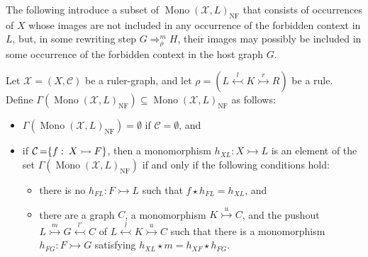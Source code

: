 The following introduce a subset of $\operatorname{Mono}(\mathcal{X},L)_{\operatorname{NF}}$ that consists of occurrences of $X$ whose images are not included in any occurrence of the forbidden context in $L$,
    but, in some rewriting step $G \mathop{\Rightarrow}_\rho^m H$, their images may possibly be included in some occurrence of the forbidden context in the host graph $G$.
\begin{definition}
    \label{antipattern:def:gamma_l_rho_x}
    Let $\mathcal{X}=(X,\mathcal{C})$ be a ruler-graph, and let \( \rho \mathop{=} (L \overset{l}{\leftarrowtail} K \overset{r}{\rightarrowtail} R) \) be a rule.
    Define $\Gamma(\operatorname{Mono}(\mathcal{X},L)_{\operatorname{NF}})\subseteq \operatorname{Mono}(\mathcal{X},L)_{\operatorname{NF}}$ as follows:
    \begin{itemize}
        \item $\Gamma(\operatorname{Mono}(\mathcal{X},L)_{\operatorname{NF}}) \mathop{=} \emptyset$ if $\mathcal{C} \mathop{=} \emptyset$, and
        \item if $\mathcal{C} \mathop{=} \{f\mathop{\colon}X \rightarrowtail F\}$, then a monomorphism $h_{XL} \mathop{\colon} X \rightarrowtail L$ is an element of the set $\Gamma(\operatorname{Mono}(\mathcal{X},L)_{\operatorname{NF}})$ if and only if the following conditions hold:
            \begin{itemize}
                \item there is no $h_{FL}:F \rightarrowtail L$ such that $f \mathop{\star} h_{FL} \mathop{=} h_{XL}$, and
                \item  
                there are a graph $C$, a monomorphism $K \overset{u}{\rightarrowtail} C$, and the pushout $L \overset{m}{\rightarrowtail} G \overset{l'}{\leftarrowtail} C$ of $L \overset{l}{\leftarrowtail} K \overset{u}{\rightarrowtail} C$ such that
                there is a monomorphism $h_{FG} \mathop{\colon} F \rightarrowtail G$ satisfying
                $h_{XL} \mathop{\star} m \mathop{=} h_{XF} \mathop{\star} h_{FG}$. 
            \begin{center}
\end{center}
\end{itemize}
\end{itemize}
\end{definition}
